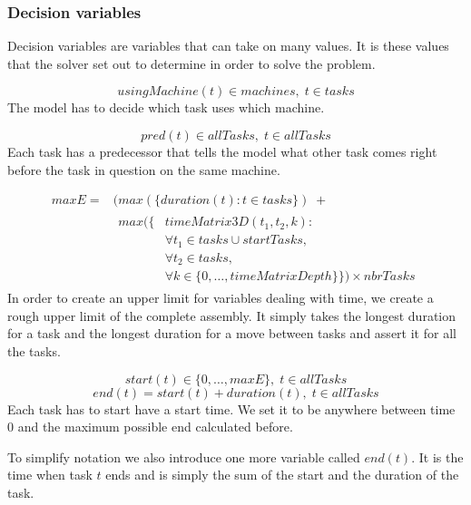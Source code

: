  
 \subsubsection{Decision variables}
 Decision variables are variables that can take on many values. It is these values that the solver set out to determine in order to solve the problem.
 
 \begin{equation}\label{eq:40}
 usingMachine(t) \in machines, \; t \in tasks
 \end{equation}
 The model has to decide which task uses which machine.
 
 \begin{equation}\label{eq:41}
 pred(t) \in allTasks, \; t \in allTasks
 \end{equation}
Each task has a predecessor that tells the model what other task comes right before the task in question on the same machine.
 
 \begin{equation}
 \begin{aligned}\label{eq:maxE}
 maxE = &(max(\{duration(t) : t \in tasks\}) \; +  \\ 
 &\begin{aligned}
 max(\{&timeMatrix3D(t_1,t_2,k) : \\
 &\forall t_1 \in tasks \cup startTasks,  \\ 
 &\forall t_2 \in tasks,\\
 &\forall k \in \{0 , \ldots , timeMatrixDepth\}\}) \times nbrTasks
  \end{aligned}
 \end{aligned}
 \end{equation}
 In order to create an upper limit for variables dealing with time, we create a rough upper limit of the complete assembly. It simply takes the longest duration for a task and the longest duration for a move between tasks and assert it for all the tasks.
 
 \begin{equation}\label{eq:46}
 start(t) \in \{0 , \ldots , maxE\}, \; t \in allTasks
 \end{equation} 
 \begin{equation}\label{eq:47}
 end(t) = start(t) + duration(t), \; t \in allTasks
 \end{equation}
Each task has to start have a start time. We set it to be anywhere between time $0$ and the maximum possible end calculated before.

To simplify notation we also introduce one more variable called $end(t)$. It is the time when task $t$ ends and is simply the sum of the start and the duration of the task.

